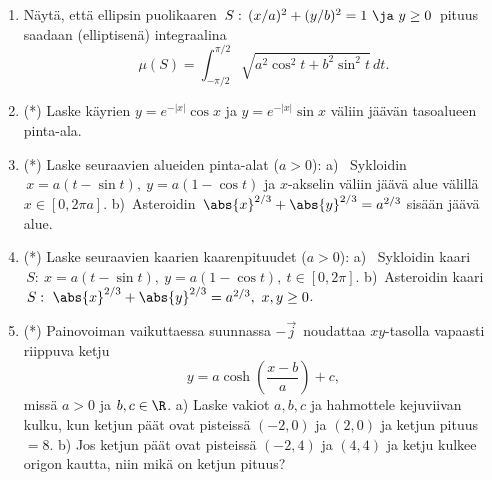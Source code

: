 \begin{enumerate}
\item
Näytä, että ellipsin puolikaaren $\,S:\,(x/a)^2+(y/b)^2=1\ \ja\ y \ge 0\,$ pituus saadaan
(elliptisenä) integraalina
\[
\mu(S)=\int_{-\pi/2}^{\pi/2} \sqrt{a^2\cos^2 t+b^2\sin^2 t}\,dt.
\]

\item (*)
Laske käyrien $y=e^{-|x|}\cos x$ ja $y=e^{-|x|}\sin x$ väliin jäävän tasoalueen pinta-ala.

\item (*)
Laske seuraavien alueiden pinta-alat ($a>0$): \vspace{1mm}\newline
a) \ Sykloidin $\,x=a(t-\sin t),\ y=a(1-\cos t)$ ja $x$-akselin väliin jäävä alue välillä
$x\in[0,2\pi a]$. \newline
b)\, Asteroidin $\,\abs{x}^{2/3}+\abs{y}^{2/3}=a^{2/3}$ sisään jäävä alue.

\item (*)
Laske seuraavien kaarien kaarenpituudet ($a>0$): \vspace{1mm}\newline
a) \ Sykloidin kaari $\,S:\ x=a(t-\sin t),\ y=a(1-\cos t),\ t\in[0,2\pi]$. \newline
b)\, Asteroidin kaari $\,S:\ \abs{x}^{2/3}+\abs{y}^{2/3}=a^{2/3},\ x,y \ge 0$.

\item (*) \label{H-int-8: ketjuviiva} 
Painovoiman vaikuttaessa suunnassa $-\vec j\,$ noudattaa $xy$-tasolla vapaasti riippuva ketju
\[
y=a\cosh\left(\frac{x-b}{a}\right)+c,
\]
missä $a>0$ ja $b,c\in\R$. \vspace{1mm}\newline
a) Laske vakiot $a,b,c$ ja hahmottele kejuviivan kulku, kun ketjun päät ovat pisteissä $(-2,0)$
ja $(2,0)$ ja ketjun pituus $=8$. \vspace{1mm}\newline
b) Jos ketjun päät ovat pisteissä $(-2,4)$ ja $(4,4)$ ja ketju kulkee origon kautta, niin mikä
on ketjun pituus?

\end{enumerate}
